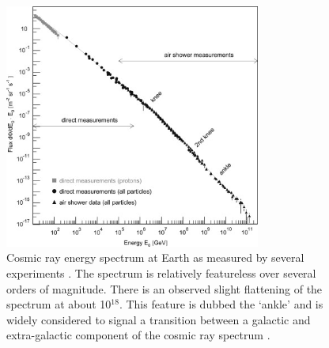 \documentclass{gatech-thesis}
\begin{document}
\begin{figure}[ht]
  \begin{center}
    \includegraphics[width=0.75\textwidth,keepaspectratio]{CosmicRaySpectrum.jpg}
  \end{center}
  \caption[Cosmic Ray Spectrum]{Cosmic ray energy spectrum at Earth as measured by several experiments \cite{2009PrPNP..63..293B}. The spectrum is relatively featureless over several orders of magnitude. There is an observed slight flattening of the spectrum at about 10$^{18}$. This feature is dubbed the `ankle' and is widely considered to signal a transition between a galactic and extra-galactic component of the cosmic ray spectrum \cite{2012APh....39..129A}.}
  \label{fig:cosmicray_spec}
\end{figure}
\end{document}
